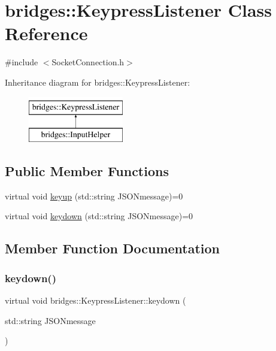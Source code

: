\hypertarget{classbridges_1_1_keypress_listener}{}\section{bridges\+::Keypress\+Listener Class Reference}
\label{classbridges_1_1_keypress_listener}


{\ttfamily \#include $<$Socket\+Connection.\+h$>$}

Inheritance diagram for bridges\+::Keypress\+Listener\+:\begin{figure}[H]
\begin{center}
\leavevmode
\includegraphics[height=2.000000cm]{classbridges_1_1_keypress_listener}
\end{center}
\end{figure}
\subsection*{Public Member Functions}
\begin{DoxyCompactItemize}
\item 
virtual void \mbox{\hyperlink{classbridges_1_1_keypress_listener_ad5af91d35dc485182056ca821f3ce03e}{keyup}} (std\+::string J\+S\+O\+Nmessage)=0
\item 
virtual void \mbox{\hyperlink{classbridges_1_1_keypress_listener_a8e94db1517b295a8fc52f5ed7ddc74d0}{keydown}} (std\+::string J\+S\+O\+Nmessage)=0
\end{DoxyCompactItemize}


\subsection{Member Function Documentation}
\mbox{\label{classbridges_1_1_keypress_listener_a8e94db1517b295a8fc52f5ed7ddc74d0}} 
\subsubsection{\texorpdfstring{keydown()}{keydown()}}
{\footnotesize\ttfamily virtual void bridges\+::\+Keypress\+Listener\+::keydown (\begin{DoxyParamCaption}\item[{std\+::string}]{J\+S\+O\+Nmessage }\end{DoxyParamCaption})\hspace{0.3cm}{\ttfamily [pure virtual]}}



